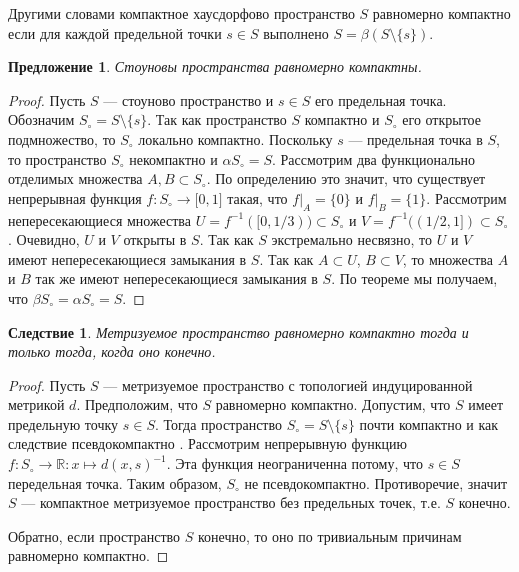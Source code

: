 \documentclass[12pt]{article}
\newtheorem{proposition}[theorem]{Предложение}
\newtheorem{corollary}[theorem]{Следствие}
\begin{document}
Другими словами компактное хаусдорфово пространство $S$ равномерно компактно если для каждой предельной точки $s\in S$ выполнено $S=\beta(S\setminus\{s\})$.

\begin{proposition}\label{StoneSpUnifComp} Стоуновы пространства равномерно компактны.
\end{proposition}
\begin{proof} Пусть $S$ --- стоуново пространство и $s\in S$ его предельная точка. Обозначим $S_\circ=S\setminus\{s\}$. Так как пространство $S$ компактно и $S_\circ$ его открытое подмножество, то $S_\circ$ локально компактно. Поскольку $s$ --- предельная точка в $S$, то пространство $S_\circ$ некомпактно и $\alpha S_\circ=S$. Рассмотрим два функционально отделимых множества $A,B\subset S_\circ$. По определению это значит, что существует непрерывная функция $f:S_\circ\to\mathbb[0,1]$ такая, что $f|_A=\{0\}$ и $f|_B=\{1\}$. Рассмотрим непересекающиеся множества $U=f^{-1}([0,1/3))\subset S_\circ$ и $V=f^{-1}((1/2,1])\subset S_\circ$. Очевидно, $U$ и $V$ открыты в $S$. Так как $S$ экстремально несвязно, то $U$ и $V$ имеют непересекающиеся замыкания в $S$. Так как $A\subset U$, $B\subset V$,  то множества $A$ и $B$ так же имеют непересекающиеся замыкания в $S$. По теореме \cite[теорема 3.6.2]{EngkingGenTop} мы получаем, что $\beta S_\circ=\alpha S_\circ=S$.
\end{proof}

\begin{corollary} \label{MesSpUnifCompIffFin} Метризуемое пространство равномерно компактно тогда и только тогда, когда оно конечно.
\end{corollary}
\begin{proof} Пусть $S$ --- метризуемое пространство с топологией индуцированной метрикой $d$. Предположим, что $S$ равномерно компактно. Допустим, что $S$ имеет предельную точку $s\in S$. Тогда пространство $S_\circ=S\setminus\{s\}$ почти компактно и как следствие псевдокомпактно \cite[предложение 1.3.10]{HrusPsdCompTopSp}. Рассмотрим непрерывную функцию $f:S_\circ\to\mathbb{R}:x\mapsto d(x,s)^{-1}$. Эта функция неограниченна потому, что $s\in S$ передельная точка. Таким образом, $S_\circ$ не псевдокомпактно. Противоречие, значит $S$ --- компактное метризуемое пространство без предельных точек, т.е. $S$ конечно.

    Обратно, если пространство $S$ конечно, то оно по тривиальным причинам равномерно компактно.
\end{proof}
\end{document}
